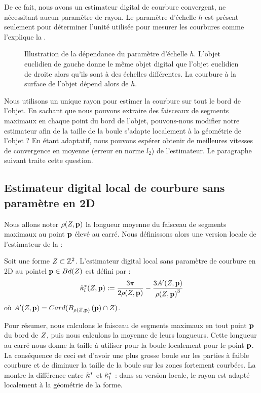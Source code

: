 De ce fait, nous avons un estimateur digital de courbure convergent, ne nécessitant aucun paramètre de rayon. Le paramètre d'échelle $h$ est présent
seulement pour déterminer l'unité utilisée pour mesurer les courbures comme
l'explique la .

\begin{figure}[ht]
  \begin{center}
    
  \end{center}
  \caption[Illustration de la dépendance du paramètre d'échelle $h$.]
  {Illustration de la dépendance du paramètre d'échelle $h$. L'objet euclidien
  de gauche donne le même objet digital que l'objet euclidien de droite alors
  qu'ils sont à des échelles différentes. La courbure à la surface de l'objet
  dépend alors de $h$.\label{fig:2d-parameter-free-explained}}
\end{figure}

Nous utilisons un unique rayon pour estimer la courbure sur tout le bord de
l'objet. En sachant que nous pouvons extraire des faisceaux de segments maximaux
en chaque point du bord de l'objet, pouvons-nous modifier notre estimateur afin
de la taille de la boule s'adapte localement à la géométrie de l'objet ? En
étant adaptatif, nous pouvons espérer obtenir de meilleures vitesses de
convergence en moyenne (erreur en norme $l_2$) de l'estimateur. Le paragraphe
suivant traite cette question.

\subsection{Estimateur digital local de courbure sans paramètre en 2D}

Nous allons noter $\rho(Z,\mathbf{p})$ la longueur moyenne du faisceau de
segments maximaux au point $\mathbf{p}$ élevé au carré. Nous définissons alors une
version locale de l'estimateur de la
 :
%
\begin{definition}
  Soit une forme $Z \subset \mathbb{Z}^2$. L'estimateur digital local sans
  paramètre de courbure en 2D au pointel $\mathbf{p} \in Bd({Z})$ est défini par :
  \begin{equation}
    \hat{\kappa}^{*}_{l}(Z, \mathbf{p}) := \frac{3\pi}{2 \rho(Z,\mathbf{p})} - \frac{3 A'(Z,\mathbf{p})}{{\rho(Z,\mathbf{p})}^3}
  \end{equation}
  où $A'(Z, \mathbf{p}) = Card(B_{\rho(Z,\mathbf{p})}\left(\mathbf{p}\right) \cap
  Z)$.
\end{definition}
%
Pour résumer, nous calculons le faisceau de segments maximaux en tout point
$\mathbf{p}$ du bord de $Z$, puis nous calculons la moyenne de leurs longueurs.
Cette longueur au carré nous donne la taille à utiliser pour la boule localement
pour le point $\mathbf{p}$. La conséquence de ceci est d'avoir une plus grosse boule
sur les parties à faible courbure et de diminuer la taille de la boule sur les
zones fortement courbées. La  montre la
différence entre $\hat{\kappa}^{*}$ et $\hat{\kappa}^{*}_{l}$ : dans sa version locale, le rayon est
adapté localement à la géométrie de la forme.


